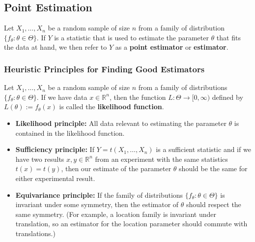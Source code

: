 \subsection{Point Estimation}

\begin{definition} Let \(X_1, \ldots, X_n\) be a random sample of size \(n\) from a family of distribution \(\{f_\theta: \theta \in \Theta\}\). If \(Y\) is a statistic that is used to estimate the parameter \(\theta\) that fits the data at hand, we then refer to \(Y\) as a \textbf{point estimator} or \textbf{estimator}.

\end{definition}

\subsubsection{Heuristic Principles for Finding Good Estimators}

\begin{definition}Let \(X_1, \ldots, X_n\) be a random sample of size \(n\) from a family of distributions \(\{f_\theta: \theta \in \Theta\}\). If we have data \(x \in \mathbb{R}^n\), then the function \(L: \Theta \to [0, \infty)\) defined by \(L(\theta):= f_\theta(x)\) is called the \textbf{likelihood function}.

\end{definition}



\begin{itemize}

\item \textbf{Likelihood principle:} All data relevant to estimating the parameter \(\theta\) is contained in the likelihood function.

\item \textbf{Sufficiency principle:} If \(Y = t(X_1, \ldots, X_n)\) is a sufficient statistic and if we have two results \(x, y \in \mathbb{R}^n\) from an experiment with the same statistics \(t(x) = t(y)\), then our estimate of the parameter \(\theta\) should be the same for either experimental result.

\item \textbf{Equivariance principle:} If the family of distributions \(\{f_\theta: \theta \in \Theta\}\)  is invariant under some symmetry, then the estimator of \(\theta\) should respect the same symmetry. (For example, a location family is invariant under translation, so an estimator for the location parameter should commute with translations.)

\end{itemize}

